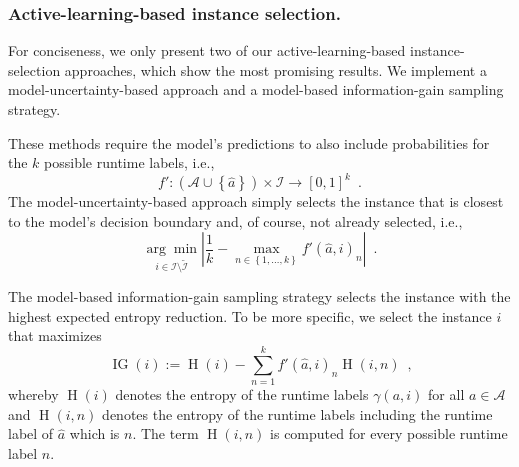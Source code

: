 \documentclass[runningheads]{llncs}
\begin{document}
\subsubsection{Active-learning-based instance selection.}
\label{sec:sampling2}
For conciseness, we only present two of our active-learning-based instance-selection approaches, which show the most promising results.
We implement a model-uncertainty-based approach and a model-based information-gain sampling strategy.

These methods require the model's predictions to also include probabilities for the $k$ possible runtime labels, i.e., 
\begin{equation}
  f'\!: \left(\mathcal{A} \cup \left\lbrace \hat{a} \right\rbrace\right) \times \mathcal{I} \rightarrow \left[0, 1\right]^k  \enspace \textrm{.}
\end{equation}
The model-uncertainty-based approach simply selects the instance that is closest to the model's decision boundary and, of course, not already selected, i.e.,
\begin{equation}
  \underset{i \in \mathcal{I} \setminus \tilde{\mathcal{I}}}{\arg\min} \left\lvert \frac{1}{k} - \max_{n \in \left\lbrace 1, \dots, k \right\rbrace} f'\!\left(\hat{a}, i\right)_{n} \right\rvert \enspace \textrm{.}
\end{equation}

The model-based information-gain sampling strategy selects the instance with the highest expected entropy reduction.
To be more specific, we select the instance $i$ that maximizes
\begin{equation}
  \operatorname{IG}\!\left(i\right) := \operatorname{H}\!\left(i\right) - \sum_{n = 1}^{k} f'\!\left(\hat{a}, i\right)_{n} \operatorname{H}\!\left(i, n\right) \enspace \textrm{,}
\end{equation}
whereby $\operatorname{H}\!\left(i\right)$ denotes the entropy of the runtime labels $\gamma\!\left(a, i\right)$ for all $a \in \mathcal{A}$ and $\operatorname{H}\!\left(i, n\right)$ denotes the entropy of the runtime labels including the runtime label of $\hat{a}$ which is $n$.
The term $\operatorname{H}\!\left(i, n\right)$ is computed for every possible runtime label $n$.

\end{document}
